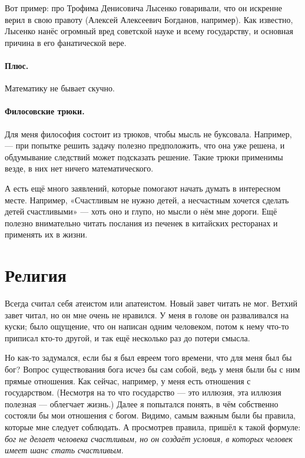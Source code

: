 \documentclass{book}
\begin{document}
Вот пример: про Трофима Денисовича Лысенко говаривали, что он искренне верил в свою правоту (Алексей Алексеевич Богданов, например).
Как известно, Лысенко нанёс огромный вред советской науке и всему государству, и основная причина в его фанатической вере.

\paragraph{Плюс.}
Математику не бывает скучно.

\paragraph{Филосовские трюки.}
Для меня философия состоит из трюков, чтобы мысль не буксовала.
Например,  --- при попытке решить задачу полезно предположить, что она уже решена, и обдумывание следствий может подсказать решение.
Такие трюки применимы везде, в них нет ничего математического.

А есть ещё много заявлений, которые помогают начать думать в интересном месте.
Например, «Счастливым не нужно детей, а несчастным хочется сделать детей счастливыми» --- хоть оно и глупо, но мысли о нём мне дороги.
Ещё полезно внимательно читать послания из печенек в китайских ресторанах и применять их в жизни.

\section*{Религия}

Всегда считал себя атеистом или апатеистом.
Новый завет читать не мог.
Ветхий завет читал, но он мне очень не нравился.
У меня в голове он разваливался на куски; было ощущение, что он написан одним человеком, потом к нему что-то приписал кто-то другой, и так ещё несколько раз до потери смысла.

Но как-то задумался, если бы я был евреем того времени, что для меня был бы бог?
Вопрос существования бога исчез бы сам собой, ведь у меня были бы с ним прямые отношения.
Как сейчас, например, у меня есть отношения с государством. 
(Несмотря на то что государство --- это иллюзия, эта иллюзия полезная --- облегчает жизнь.)
Далее я попытался понять, в чём собственно состояли бы мои отношения с богом.
Видимо, самым важным были бы правила, которые мне следует соблюдать.
А просмотрев правила, пришёл к такой формуле: \emph{бог не делает человека счастливым, но он создаёт условия, в которых человек имеет шанс стать счастливым}.
\end{document}
